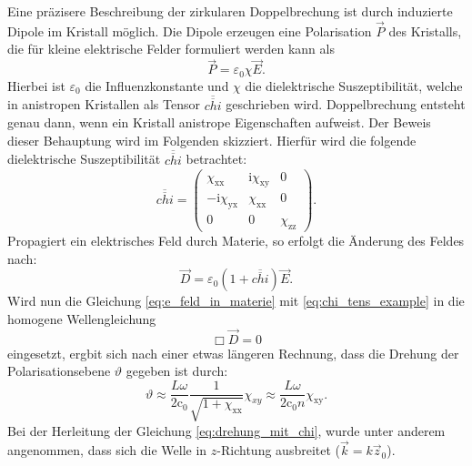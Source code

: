 Eine präzisere Beschreibung der zirkularen Doppelbrechung ist durch induzierte
Dipole im Kristall möglich.
Die Dipole erzeugen eine Polarisation $\vec{P}$ des Kristalls,
die für kleine elektrische Felder formuliert werden kann als
\begin{equation*}
\vec{P}=\varepsilon_0\chi\vec{E}.
\end{equation*}
Hierbei ist $\varepsilon_0$ die Influenzkonstante und $\chi$ die
dielektrische Suszeptibilität, welche in anistropen Kristallen als
Tensor $\overline{\overline{chi}}$ geschrieben wird.
Doppelbrechung entsteht genau dann, wenn ein Kristall anistrope Eigenschaften aufweist.
Der Beweis dieser Behauptung wird im Folgenden skizziert.
Hierfür wird die folgende dielektrische Suszeptibilität
 $\overline{\overline{chi}}$ betrachtet:
\begin{equation}
  \label{eq:chi_tens_example}
  \overline{\overline{chi}}=\begin{pmatrix} \chi_\text{xx} & \text{i}\chi_\text{xy} & 0 \\ -\text{i}\chi_\text{yx} & \chi_\text{xx} & 0 \\ 0 & 0 & \chi_\text{zz} \end{pmatrix}.
\end{equation}
Propagiert ein elektrisches Feld durch Materie, so erfolgt die Änderung des Feldes nach:
\begin{equation}
  \label{eq:e_feld_in_materie}
  \vec{D}=\varepsilon_0\left(1+\overline{\overline{chi}}\right)\vec{E}.
\end{equation}
Wird nun die Gleichung \eqref{eq:e_feld_in_materie} mit \eqref{eq:chi_tens_example}
in die homogene Wellengleichung
\begin{equation*}
  \Box \vec{D} = 0
\end{equation*}
eingesetzt, ergbit sich nach einer etwas längeren Rechnung,
dass die Drehung der Polarisationsebene $\vartheta$ gegeben ist durch:
\begin{equation}
  \label{eq:drehung_mit_chi}
  \vartheta \approx \frac{L\omega}{2\text{c}_0} \frac{1}{\sqrt{1+\chi_\text{xx}}} \chi_{xy}\approx \frac{L\omega}{2\text{c}_0n} \chi_\text{xy}.
\end{equation}
Bei der Herleitung der Gleichung \eqref{eq:drehung_mit_chi}, wurde unter anderem angenommen,
dass sich die Welle in $z$-Richtung ausbreitet ($\vec{k}=k\vec{z}_0$).

